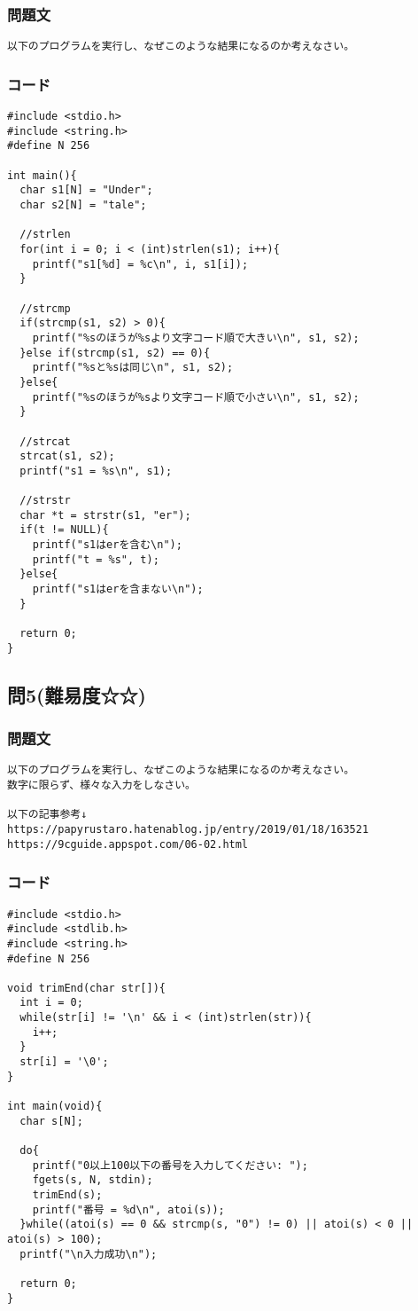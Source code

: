 \subsubsection{問題文}
\begin{verbatim}
以下のプログラムを実行し、なぜこのような結果になるのか考えなさい。
\end{verbatim}

\subsubsection{コード}
\begin{verbatim}
#include <stdio.h>
#include <string.h>
#define N 256

int main(){
  char s1[N] = "Under";
  char s2[N] = "tale";

  //strlen
  for(int i = 0; i < (int)strlen(s1); i++){
    printf("s1[%d] = %c\n", i, s1[i]);
  }

  //strcmp
  if(strcmp(s1, s2) > 0){
    printf("%sのほうが%sより文字コード順で大きい\n", s1, s2);
  }else if(strcmp(s1, s2) == 0){
    printf("%sと%sは同じ\n", s1, s2);
  }else{
    printf("%sのほうが%sより文字コード順で小さい\n", s1, s2);
  }

  //strcat
  strcat(s1, s2);
  printf("s1 = %s\n", s1);

  //strstr
  char *t = strstr(s1, "er");
  if(t != NULL){
    printf("s1はerを含む\n");
    printf("t = %s", t);
  }else{
    printf("s1はerを含まない\n");
  }

  return 0;
}
\end{verbatim}

\subsection{問5(難易度☆☆)}
\subsubsection{問題文}
\begin{verbatim}
以下のプログラムを実行し、なぜこのような結果になるのか考えなさい。
数字に限らず、様々な入力をしなさい。

以下の記事参考↓
https://papyrustaro.hatenablog.jp/entry/2019/01/18/163521
https://9cguide.appspot.com/06-02.html
\end{verbatim}

\subsubsection{コード}
\begin{verbatim}
#include <stdio.h>
#include <stdlib.h>
#include <string.h>
#define N 256

void trimEnd(char str[]){
  int i = 0;
  while(str[i] != '\n' && i < (int)strlen(str)){
    i++;
  }
  str[i] = '\0';
}

int main(void){
  char s[N];

  do{
    printf("0以上100以下の番号を入力してください: ");
    fgets(s, N, stdin);
    trimEnd(s);
    printf("番号 = %d\n", atoi(s));
  }while((atoi(s) == 0 && strcmp(s, "0") != 0) || atoi(s) < 0 || atoi(s) > 100);
  printf("\n入力成功\n");

  return 0;
}
\end{verbatim}
